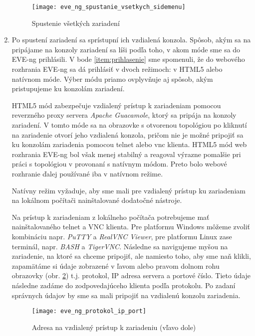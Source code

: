 \begin{enumerate}[noitemsep]
\begin{figure}
    \centering
    \texttt{[image: eve\_ng\_spustanie\_vsetkych\_sidemenu]}
    \caption{Spustenie všetkých zariadení}
    \label{obr:eve_ng_spustanie_vsetkych_context_menu}
\end{figure}
      
    \item \label{item:vzdialeny_pristup} Po spustení zariadení sa sprístupní ich vzdialená konzola. Spôsob, akým sa na pripájame na konzoly zariadení sa líši podľa toho, v akom móde sme sa do EVE-ng prihlásili. V bode \ref{item:prihlasenie} sme spomenuli, že do webového rozhrania EVE-ng sa dá prihlásiť v dvoch režimoch: v HTML5 alebo natívnom móde. Výber módu priamo ovplyvňuje aj spôsob, akým pristupujeme ku konzolám zariadení.
    
    HTML5 mód zabezpečuje vzdialený prístup k zariadeniam pomocou reverzného proxy servera \emph{Apache Guacamole}, ktorý sa pripája na konzoly zariadení. V tomto móde sa na obrazovke s otvorenou topológiou po kliknutí na zariadenie otvorí jeho vzdialená konzola, pričom nie je možné pripojiť sa ku konzolám zariadenia pomocou telnet alebo vnc klienta. HTML5 mód web rozhrania EVE-ng bol však menej stabilný a reagoval výrazne pomalšie pri práci s topológiou v provonaní s natívnym módom. Preto bolo webové rozhranie ďalej používané iba v natívnom režime.
        
    Natívny režim vyžaduje, aby sme mali pre vzdialený prístup ku zariadeniam na lokálnom počítači nainštalované dodatočné nástroje. 
        
    Na prístup k zariadeniam z lokálneho počítača potrebujeme mať nainštalovaného telnet a VNC klienta. Pre platformu Windows môžeme zvoliť kombináciu napr. \emph{PuTTY} a \emph{RealVNC Viewer}, pre platformu Linux zase terminál, napr. \emph{BASH} a \emph{TigerVNC}. Následne sa navigujeme myšou na zariadenie, na ktoré sa chceme pripojiť, ale namiesto toho, aby sme naň klikli, zapamätáme si údaje zobrazené v ľavom alebo pravom dolnom rohu obrazovky (obr. \ref{obr:eve_ng_protokol_ip_port}) t.j. protokol, IP adresa servera a portové číslo. Tieto údaje následne zadáme do zodpovedajúceho klienta podľa protokolu. Po zadaní správnych údajov by sme sa mali pripojiť na vzdialenú konzolu zariadenia.

\begin{figure}
    \centering
    \texttt{[image: eve\_ng\_protokol\_ip\_port]}
    \caption{Adresa na vzdialený prístup k zariadeniu (vľavo dole)}
    \label{obr:eve_ng_protokol_ip_port}
\end{figure}


\end{enumerate}

